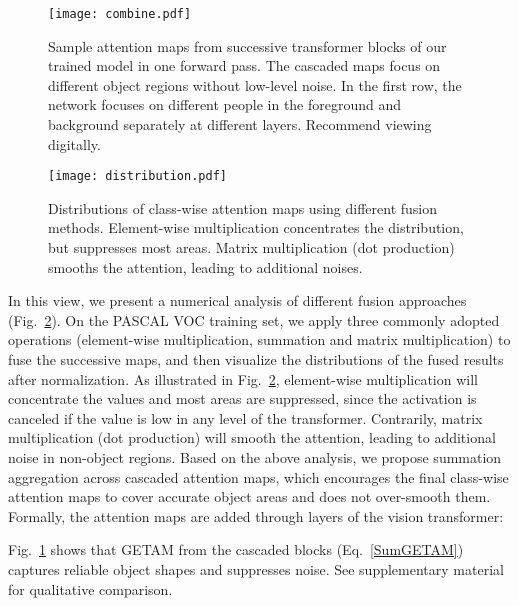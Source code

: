 \documentclass[10pt,twocolumn,letterpaper]{article}
\begin{document}
\begin{figure}[!t]
   \begin{center}
   {\texttt{[image: combine.pdf]}} 
   \end{center}
\caption{Sample attention maps from successive transformer blocks of our trained model in one forward pass. The cascaded maps focus on different object regions without low-level noise.
In the first row, the network focuses on different people in the foreground and background separately at different layers.
Recommend viewing digitally. 
}
\label{fig:combine}
\end{figure}


\begin{figure}[!t]
   \begin{center}
   {\texttt{[image: distribution.pdf]}} 
   \end{center}
\caption{Distributions of class-wise attention maps using different fusion methods. Element-wise multiplication concentrates the distribution, but suppresses most areas. Matrix multiplication (dot production) smooths the attention, leading to additional noises.
}
\label{fig:distribution}
\end{figure}

In this view, we present a numerical analysis of different fusion approaches (Fig.~\ref{fig:distribution}). 
On the PASCAL VOC \cite{everingham2010pascal} training set, we apply three commonly adopted operations (element-wise multiplication, summation and matrix multiplication) to fuse the successive maps, and then visualize the distributions of the fused results after normalization.
As illustrated in Fig.~\ref{fig:distribution}, element-wise multiplication will concentrate the values and most areas are suppressed, since the activation is canceled if the value is low 
in any level of the transformer. Contrarily, matrix multiplication (dot production) will smooth the attention, leading to additional noise in non-object regions.
Based on the above analysis, we propose summation aggregation across cascaded attention maps, which encourages the final class-wise attention maps to cover accurate object areas and does not over-smooth them.
Formally, the attention maps are added through  layers of the vision transformer:

Fig.~\ref{fig:combine} shows that GETAM from the cascaded blocks (Eq.~\ref{SumGETAM})
captures reliable object shapes and suppresses noise.
See supplementary material for 
qualitative comparison.
\end{document}
